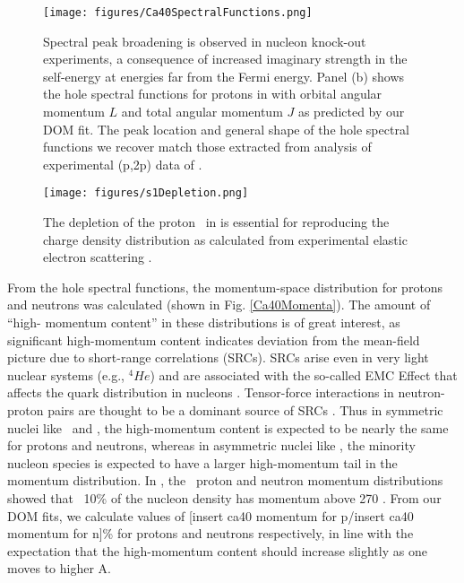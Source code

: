 \begin{figure}[tb]
    \centering
    \texttt{[image: figures/Ca40SpectralFunctions.png]}
    \caption[Spectral peak broadening in \caForty: DOM prediction and experimental (p,2p) data]
    {
        Spectral peak broadening is observed in nucleon knock-out experiments, a 
        consequence of increased imaginary strength in the self-energy at energies far from the
        Fermi energy. Panel (b) shows the hole spectral functions for protons in \caForty
        with orbital angular momentum $L$ and total angular momentum $J$ as predicted by our DOM fit.
        The peak location and general shape of the hole spectral functions we recover match those
        extracted from analysis of experimental (p,2p) data of \cite{LiverpoolCa40}.
    }
    \label{Ca40SpectralFunctions}
\end{figure}

\begin{figure}[tb]
    \centering
    \texttt{[image: figures/s1Depletion.png]}
    \caption[Depletion of proton \sOne\ in \caForty essential to reproduce charge density
    distribution]
    {
        The depletion of the proton \sOne\ in \caForty is essential
        for reproducing the charge density
        distribution as calculated from experimental elastic electron scattering \cite{DeVries1987}.
    }
    \label{s1Depletion}
\end{figure}

From the hole spectral functions, the momentum-space distribution for protons and neutrons was
calculated (shown in Fig. \ref{Ca40Momenta}). The amount of ``high-
momentum content'' in these distributions is of great interest, as significant high-momentum content 
indicates deviation from the mean-field picture due to short-range correlations (SRCs). SRCs arise 
even in very light nuclear systems (e.g., $^{4}He$)
and are associated with the so-called EMC Effect that affects the quark distribution in nucleons 
\cite{Hen2012, Arrington2012, CLAS2019}.
Tensor-force interactions in neutron-proton pairs are thought to be a dominant source of 
SRCs \cite{Subedi2008}. Thus in symmetric nuclei like \cTwelve\ and \caForty, the
high-momentum content is expected to be nearly the same for protons and neutrons, whereas in
asymmetric nuclei like \pbEight, the minority nucleon species is expected to have a larger
high-momentum tail in the momentum distribution. In \cite{Rohe2004}, the \cTwelve\ proton and
neutron momentum distributions showed that ~10\% of the nucleon density
has momentum above 270 \mega\electronvolt{}.
From our DOM fits, we calculate values of [insert ca40 momentum for p/insert ca40 momentum for n]\%
for protons and neutrons respectively, in line with the expectation that the high-momentum content
should increase slightly as one moves to higher A.

